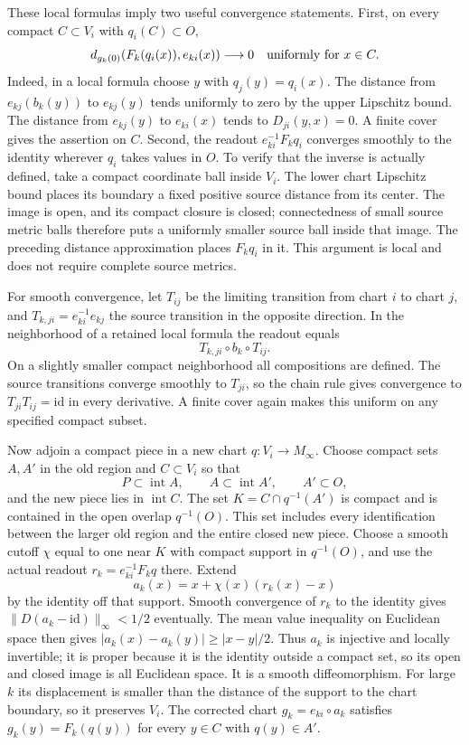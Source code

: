 These local formulas imply two useful convergence statements.
First, on every compact $C\subset V_i$ with $q_i(C)\subset O$,
\[
             d_{g_k(0)}(F_k(q_i(x)),e_{ki}(x))\longrightarrow0
             \quad\hbox{uniformly for }x\in C.
\]
Indeed, in a local formula choose $y$ with $q_j(y)=q_i(x)$.
The distance from $e_{kj}(b_k(y))$ to $e_{kj}(y)$ tends uniformly
to zero by the upper Lipschitz bound.  The distance from
$e_{kj}(y)$ to $e_{ki}(x)$ tends to $D_{ji}(y,x)=0$.
A finite cover gives the assertion on $C$.
Second, the readout $e_{ki}^{-1}F_kq_i$ converges smoothly to
the identity wherever $q_i$ takes values in $O$.  To verify that
the inverse is actually defined, take a compact coordinate ball
inside $V_i$.  The lower chart Lipschitz bound places its boundary
a fixed positive source distance from its center.  The image is
open, and its compact closure is closed; connectedness of small
source metric balls therefore puts a uniformly smaller source
ball inside that image.  The preceding distance approximation
places $F_kq_i$ in it.  This argument is local and does not require
complete source metrics.

For smooth convergence, let $T_{ij}$ be the limiting transition
from chart $i$ to chart $j$, and $T_{k,ji}=e_{ki}^{-1}e_{kj}$
the source transition in the opposite direction.  In the neighborhood
of a retained local formula the readout equals
\[
                 T_{k,ji}\circ b_k\circ T_{ij}.
\]
On a slightly smaller compact neighborhood all compositions are
defined.  The source transitions converge smoothly to $T_{ji}$,
so the chain rule gives convergence to
$T_{ji}T_{ij}=\mathrm{id}$ in every derivative.  A finite cover
again makes this uniform on any specified compact subset.

Now adjoin a compact piece in a new chart $q:V_i\to M_\infty$.
Choose compact sets $A,A'$ in the old region and $C\subset V_i$
so that
\[
 P\subset\operatorname{int}A,\qquad
 A\subset\operatorname{int}A',\qquad A'\subset O,
\]
and the new piece lies in $\operatorname{int}C$.
The set $K=C\cap q^{-1}(A')$ is compact and is contained in the
open overlap $q^{-1}(O)$.  This set includes every identification
between the larger old region and the entire closed new piece.
Choose a smooth cutoff $\chi$ equal to one near $K$ with compact
support in $q^{-1}(O)$, and use the actual readout
$r_k=e_{ki}^{-1}F_kq$ there.  Extend
\[
                    a_k(x)=x+\chi(x)(r_k(x)-x)
\]
by the identity off that support.  Smooth convergence of $r_k$ to
the identity gives $\|D(a_k-\mathrm{id})\|_\infty<1/2$ eventually.
The mean value inequality on Euclidean space then gives
$|a_k(x)-a_k(y)|\geq|x-y|/2$.  Thus $a_k$ is injective and locally
invertible; it is proper because it is the identity outside a
compact set, so its open and closed image is all Euclidean space.
It is a smooth diffeomorphism.  For large $k$ its displacement is
smaller than the distance of the support to the chart boundary, so it
preserves $V_i$.  The corrected chart $g_k=e_{ki}\circ a_k$ satisfies
$g_k(y)=F_k(q(y))$ for every $y\in C$ with $q(y)\in A'$.

